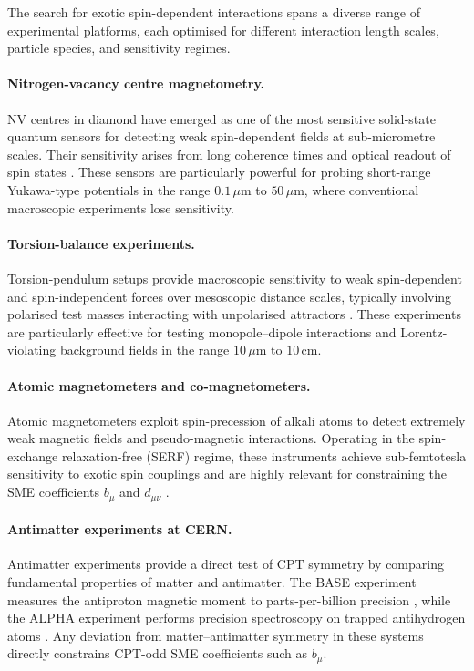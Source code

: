 \documentclass[main]{subfiles}
\begin{document}
The search for exotic spin-dependent interactions spans a diverse range of
experimental platforms, each optimised for different interaction length scales,
particle species, and sensitivity regimes.

\paragraph{Nitrogen-vacancy centre magnetometry.}
NV centres in diamond have emerged as one of the most sensitive solid-state
quantum sensors for detecting weak spin-dependent fields at sub-micrometre
scales. Their sensitivity arises from long coherence times and optical readout
of spin states \cite{Rong2018a,Rong2018b}. These sensors are particularly
powerful for probing short-range Yukawa-type potentials in the range
$0.1\,\mu\mathrm{m}$ to $50\,\mu\mathrm{m}$, where conventional macroscopic
experiments lose sensitivity.

\paragraph{Torsion-balance experiments.}
Torsion-pendulum setups provide macroscopic sensitivity to weak spin-dependent
and spin-independent forces over mesoscopic distance scales, typically involving
polarised test masses interacting with unpolarised attractors \cite{Heckel2008}.
These experiments are particularly effective for testing monopole--dipole
interactions and Lorentz-violating background fields in the range
$10\,\mu\mathrm{m}$ to $10\,\mathrm{cm}$.

\paragraph{Atomic magnetometers and co-magnetometers.}
Atomic magnetometers exploit spin-precession of alkali atoms to detect extremely
weak magnetic fields and pseudo-magnetic interactions. Operating in the
spin-exchange relaxation-free (SERF) regime, these instruments achieve
sub-femtotesla sensitivity to exotic spin couplings and are highly relevant for
constraining the SME coefficients $b_{\mu}$ and $d_{\mu\nu}$
\cite{Vasilakis2009}.

\paragraph{Antimatter experiments at CERN.}
Antimatter experiments provide a direct test of CPT symmetry by comparing
fundamental properties of matter and antimatter. The BASE experiment measures
the antiproton magnetic moment to parts-per-billion precision
\cite{Smorra2017}, while the ALPHA experiment performs precision spectroscopy on
trapped antihydrogen atoms \cite{Ahmadi2017}. Any deviation from matter--antimatter
symmetry in these systems directly constrains CPT-odd SME coefficients such as
$b_{\mu}$.
\end{document}
